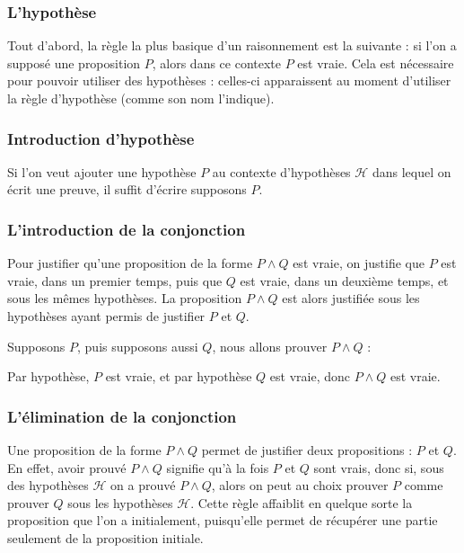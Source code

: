 \subsubsection{L'hypothèse}

Tout d'abord, la règle la plus basique d'un raisonnement est la suivante : si l'on a supposé une proposition $P$, alors dans ce contexte $P$ est vraie. Cela est nécessaire pour pouvoir utiliser des hypothèses : celles-ci apparaissent au moment d'utiliser la règle d'hypothèse (comme son nom l'indique).

\subsubsection{Introduction d'hypothèse}

Si l'on veut ajouter une hypothèse $P$ au contexte d'hypothèses $\mathcal H$ dans lequel on écrit une preuve, il suffit d'écrire \og supposons $P$\fg{}.

\subsubsection{L'introduction de la conjonction}

Pour justifier qu'une proposition de la forme $P\land Q$ est vraie, on justifie que $P$ est vraie, dans un premier temps, puis que $Q$ est vraie, dans un deuxième temps, et sous les mêmes hypothèses. La proposition $P\land Q$ est alors justifiée sous les hypothèses ayant permis de justifier $P$ et $Q$.

\begin{expl}
    Supposons $P$, puis supposons aussi $Q$, nous allons prouver $P\land Q$ :
    
    Par hypothèse, $P$ est vraie, et par hypothèse $Q$ est vraie, donc $P\land Q$ est vraie.
\end{expl}

\subsubsection{L'élimination de la conjonction}

Une proposition de la forme $P\land Q$ permet de justifier deux propositions : $P$ et $Q$. En effet, avoir prouvé $P\land Q$ signifie qu'à la fois $P$ et $Q$ sont vrais, donc si, sous des hypothèses $\mathcal H$ on a prouvé $P\land Q$, alors on peut au choix prouver $P$ comme prouver $Q$ sous les hypothèses $\mathcal H$. Cette règle affaiblit en quelque sorte la proposition que l'on a initialement, puisqu'elle permet de récupérer une partie seulement de la proposition initiale.

